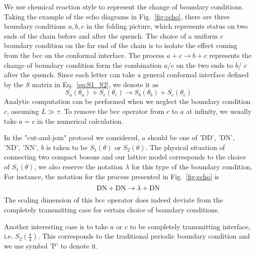 
We use chemical reaction style to represent the change of boundary conditions. Taking the example of the echo diagrams in Fig.~\ref{fig:echo}, there are three boundary conditions $a,b,c$ in the folding picture, which represents status on two ends of the chain before and after the quench. The choice of a uniform $c$ boundary condition on the far end of the chain is to isolate the effect coming from the bcc on the conformal interface. The process $a + c \rightarrow b + c$ represents the change of boundary condition form the combination $a$/$c$ on the two ends to $b$/ $c$ after the quench. Since each letter can take a general conformal interface defined by the $S$ matrix in Eq.~\eqref{eq:S1_S2}, we denote it as
\begin{equation}
S_a( \theta_a ) + S_c( \theta_c) \rightarrow S_b( \theta_b )  + S_c( \theta_c ) 
\end{equation}
Analytic computation can be performed when we neglect the boundary condition $c$, assuming $L \gg \tau$. To remove the bcc operator from $c$ to $a$ at infinity, we usually take $a = c$ in the numerical calculation. 

In the "cut-and-join" protocol we considered, $a$ should be one of 'DD', 'DN', 'ND', 'NN', $b$ is taken to be $S_1( \theta )$ or $S_2( \theta )$. The physical situation of connecting two compact bosons and our lattice model corresponds to the choice of $S_1( \theta)$, we also reserve the notation $\lambda$ for this type of the boundary condition. For instance, the notation for the process presented in Fig.~\ref{fig:echo} is
\begin{equation}
{\rm DN }  + {\rm DN} \rightarrow \lambda + { \rm DN} 
\end{equation}
The scaling dimension of this bcc operator does indeed deviate from the completely transmitting case for certain choice of boundary conditions. 

Another interesting case is to take $a$ or $c$ to be completely transmitting interface, i.e. $S_2( \frac{\pi}{4} )$. This corresponds to the traditional periodic boundary condition and we use symbol 'P' to denote it. 


